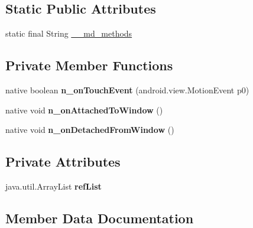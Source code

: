 \subsection*{Static Public Attributes}
\begin{DoxyCompactItemize}
\item 
static final String \hyperlink{classmd5b60ffeb829f638581ab2bb9b1a7f4f3f_1_1PageRenderer_aae4f94a2ae5f7a20817732bf98264a0a}{\+\_\+\+\_\+md\+\_\+methods}
\end{DoxyCompactItemize}
\subsection*{Private Member Functions}
\begin{DoxyCompactItemize}
\item 
\mbox{\label{classmd5b60ffeb829f638581ab2bb9b1a7f4f3f_1_1PageRenderer_ae06757e6f6dff9d51c3f4846c4ccae1f}} 
native boolean {\bfseries n\+\_\+on\+Touch\+Event} (android.\+view.\+Motion\+Event p0)
\item 
\mbox{\label{classmd5b60ffeb829f638581ab2bb9b1a7f4f3f_1_1PageRenderer_a4eec70029c094a9d58a5dc091fef3ebf}} 
native void {\bfseries n\+\_\+on\+Attached\+To\+Window} ()
\item 
\mbox{\label{classmd5b60ffeb829f638581ab2bb9b1a7f4f3f_1_1PageRenderer_a940e352be04c4028a06fcdb63e29ed52}} 
native void {\bfseries n\+\_\+on\+Detached\+From\+Window} ()
\end{DoxyCompactItemize}
\subsection*{Private Attributes}
\begin{DoxyCompactItemize}
\item 
\mbox{\label{classmd5b60ffeb829f638581ab2bb9b1a7f4f3f_1_1PageRenderer_aac99f9c10a815f0767bf3b6697ebb44a}} 
java.\+util.\+Array\+List {\bfseries ref\+List}
\end{DoxyCompactItemize}


\subsection{Member Data Documentation}
\mbox{\label{classmd5b60ffeb829f638581ab2bb9b1a7f4f3f_1_1PageRenderer_aae4f94a2ae5f7a20817732bf98264a0a}} 
